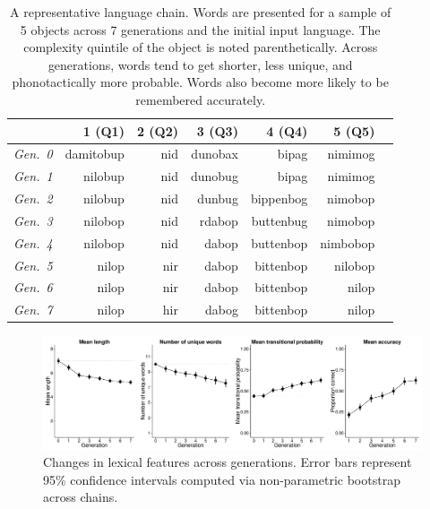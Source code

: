 \begin{table}[t]
\centering
\begin{tabular}{c rrrrrr}
\hline

& 1 (Q1)  & 2 (Q2) & 3 (Q3) &4 (Q4) &  5 (Q5)  \\ 
 \hline
    {\it Gen.\ 0} & damitobup & nid & dunobax &  bipag &  nimimog \\ 
   {\it Gen.\ 1}& nilobup & nid & dunobug& bipag  & nimimog \\ 
    {\it Gen.\ 2} & nilobup & nid &  dunbug & bippenbog &  nimobop  \\ 
  {\it Gen.\ 3} & nilobop & nid & rdabop &  buttenbug &  nimobop \\ 
   {\it Gen.\ 4} & nilobop & nid &  dabop & buttenbop &  nimbobop \\ 
    {\it Gen.\ 5}  & nilop & nir &  dabop &  bittenbop  & nilobop \\ 
   {\it Gen.\ 6}& nilop & nir & dabop &  bittenbop &nilop \\
   {\it Gen.\ 7}& nilop &  hir &  dabog &  bittenbop &nilop  \\ 
\hline
\end{tabular}
\caption{A representative language chain. Words are presented for a sample of 5 objects across 7 generations and the initial input language. The complexity quintile of the object is noted parenthetically. Across generations, words tend to get shorter, less unique, and phonotactically more probable. Words also become more likely to be remembered accurately.}
\label{tab:ex}
\end{table}
\normalsize

\begin{figure}[t!]
\begin{center}
\includegraphics[scale = .3]{figs/Plot1.pdf}
\end{center}
\vspace{-.5em}
\caption{Changes in lexical features across generations. Error bars represent 95\% confidence intervals computed via non-parametric bootstrap across chains.}
\label{fig:length}
\vspace{-1em}
\end{figure}





